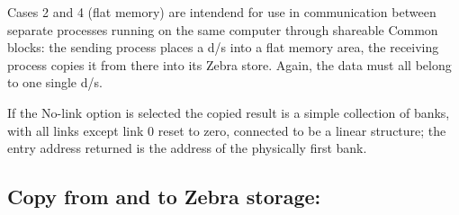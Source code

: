 Cases 2 and 4 (flat memory) are intendend for use in communication
between separate processes running on the same computer
through shareable Common blocks:
the sending process places a d/s into a flat memory area,
the receiving process copies it from there into its Zebra store.
Again, the data must all belong to one single d/s.

If the No-link option is selected the copied result
is a simple collection of banks,
with all links except link 0 reset to zero,
connected to be a linear structure;
the entry address returned is the address of
the physically first bank.


\subsection*{Copy from and to Zebra storage:}


